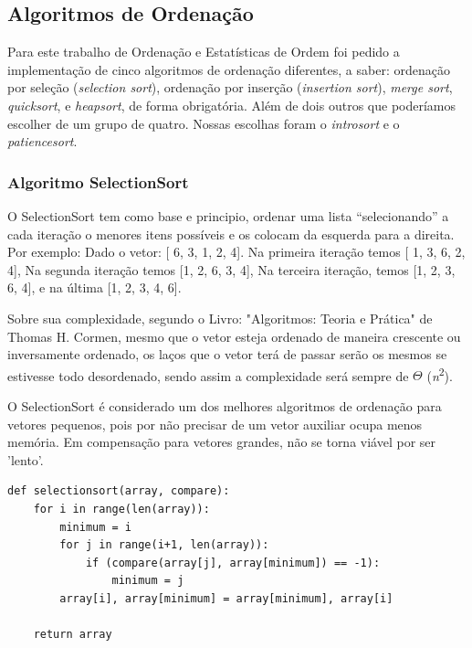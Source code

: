 \documentclass[a4paper,12pt]{scrartcl}
\begin{document}
\subsection{Algoritmos de Ordenação}
Para este trabalho de Ordenação e Estatísticas de Ordem foi pedido a implementação de cinco algoritmos de ordenação diferentes, a saber:  ordenação por seleção (\textit{selection sort}), ordenação por inserção (\textit{insertion sort}), \textit{merge sort}, \textit{quicksort}, e \textit{heapsort}, de forma obrigatória.
Além de dois outros que poderíamos escolher de um grupo de quatro. Nossas escolhas foram o \textit{introsort} e o \textit{patiencesort}.



\subsubsection{Algoritmo SelectionSort}
O SelectionSort tem como base e principio, ordenar uma lista “selecionando” a cada iteração o menores itens possíveis e os colocam da esquerda para a direita. Por exemplo: 
Dado o vetor: [ 6, 3, 1, 2, 4]. \newline
Na primeira iteração temos [ 1, 3, 6, 2, 4], \newline
Na segunda iteração temos [1, 2, 6, 3, 4], \newline
Na terceira iteração, temos [1, 2, 3, 6, 4], \newline
e na última [1, 2, 3, 4, 6]. \par Sobre sua complexidade, segundo o Livro: "Algoritmos: Teoria e Prática" de Thomas H. Cormen, mesmo que o vetor esteja ordenado de maneira crescente ou inversamente ordenado, os laços que o vetor terá de passar serão os mesmos se estivesse todo desordenado, sendo assim a complexidade será sempre de  $ \Theta $  (\textit{n}\textsuperscript{2}). \par
O SelectionSort é considerado um dos melhores algoritmos de ordenação para vetores pequenos, pois por não precisar de um vetor auxiliar ocupa menos memória. Em compensação para vetores grandes, não se torna viável por ser 'lento'.

\begin{lstlisting}
def selectionsort(array, compare):
    for i in range(len(array)):
        minimum = i
        for j in range(i+1, len(array)):
            if (compare(array[j], array[minimum]) == -1):
                minimum = j
        array[i], array[minimum] = array[minimum], array[i]
    
    return array
\end{lstlisting}
\end{document}
